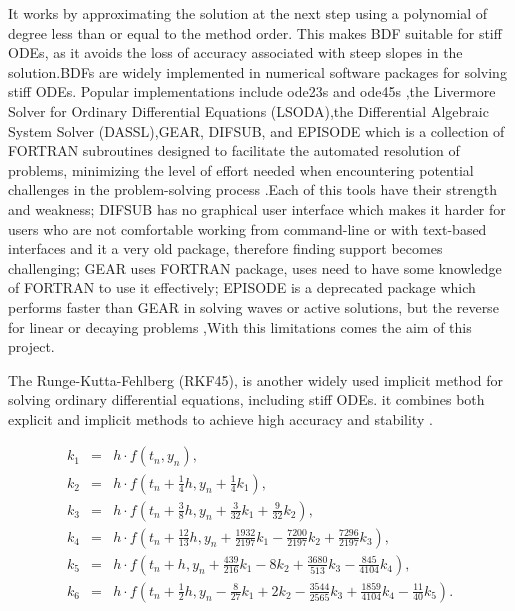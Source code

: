 It works by approximating the solution at the next step using a polynomial of degree less than or equal to the method order. This makes BDF suitable for stiff ODEs, as it avoids the loss of accuracy associated with steep slopes in the solution.BDFs are widely implemented in numerical software packages for solving stiff ODEs. Popular implementations include ode23s and ode45s \cite{shampine1997matlab},the Livermore Solver for Ordinary Differential Equations (LSODA),the Differential Algebraic System Solver (DASSL),GEAR, DIFSUB, and EPISODE \cite{Yatim2013} which is a collection of FORTRAN subroutines designed to facilitate the automated resolution of problems, minimizing the level of effort needed when encountering potential challenges in the problem-solving process \cite{thohura2013numerical}.Each of this tools have their strength and weakness; DIFSUB has no graphical user interface which makes it harder for users who are not comfortable working from command-line or with text-based interfaces and it a very old package, therefore finding support becomes challenging; GEAR uses FORTRAN package, uses need to have some knowledge of FORTRAN to use it effectively; EPISODE is a deprecated package which performs faster than GEAR in solving waves or active solutions, but the reverse for linear or decaying problems \cite{BYRNE1977125},With this limitations comes the aim of this project.

The Runge-Kutta-Fehlberg (RKF45), is another widely used implicit method for solving ordinary differential equations, including stiff ODEs. it combines both explicit and implicit methods to achieve high accuracy and stability \cite{stone2017accelerating}.

\begin{eqnarray*}
  k_1 & = & h \cdot f(t_n, y_n), \\
  k_2 & = & h \cdot f(t_n + \frac{1}{4}h, y_n + \frac{1}{4}k_1), \\
  k_3 & = & h \cdot f(t_n + \frac{3}{8}h, y_n + \frac{3}{32}k_1 + \frac{9}{32}k_2), \\
  k_4 & = & h \cdot f(t_n + \frac{12}{13}h, y_n + \frac{1932}{2197}k_1 - \frac{7200}{2197}k_2 + \frac{7296}{2197}k_3), \\
  k_5 & = & h \cdot f(t_n + h, y_n + \frac{439}{216}k_1 - 8k_2 + \frac{3680}{513}k_3 - \frac{845}{4104}k_4), \\
  k_6 & = & h \cdot f(t_n + \frac{1}{2}h, y_n - \frac{8}{27}k_1 + 2k_2 - \frac{3544}{2565}k_3 + \frac{1859}{4104}k_4 - \frac{11}{40}k_5).
  \end{eqnarray*}
  
